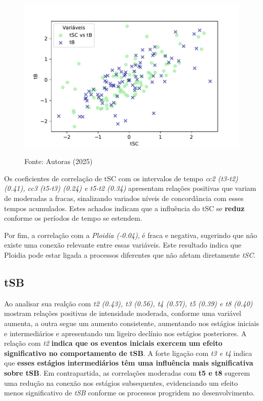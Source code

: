 \begin{figure}[h]
\begin{minipage}[b]{0.45\linewidth}
        \includegraphics[scale=0.35]{figuras/Spearman/tSC-tB.pdf}
        \vspace{0.3cm}
        \begin{minipage}{\linewidth}
            \centering
            \scriptsize{Fonte: Autoras (2025)}
        \end{minipage}
    \end{minipage}
\end{figure}
\FloatBarrier

Os coeficientes de correlação de tSC com os intervalos de tempo \textit{cc2 (t3-t2) (0.41), cc3 (t5-t3) (0.24) e t5-t2 (0.34)} apresentam relações positivas que variam de moderadas a fracas, sinalizando variados níveis de concordância com esses tempos acumulados. Estes achados indicam que a influência do tSC se \textbf{reduz} conforme os períodos de tempo se estendem.

Por fim, a correlação com a \textit{Ploidia (-0.04)}, é fraca e negativa, sugerindo que não existe uma conexão relevante entre essas variáveis. Este resultado indica que Ploidia pode estar ligada a processos diferentes que não afetam diretamente \textit{tSC}.

\subsection*{tSB}
Ao analisar sua realção com \textit{t2 (0.43), t3 (0.56), t4 (0.57), t5 (0.39) e t8 (0.40)} mostram relações positivas de intensidade moderada, conforme uma variável aumenta, a outra segue um aumento consistente, aumentando nos estágios iniciais e intermediários e apresentando um ligeiro declínio nos estágios posteriores. A relação com \textit{t2} \textbf{indica que os eventos iniciais exercem um efeito significativo no comportamento de \textbf{tSB}}. A forte ligação com \textit{t3 e t4} indica que \textbf{esses estágios intermediários têm uma influência mais significativa sobre \textbf{tSB}}. Em contrapartida, as correlações moderadas com \textbf{t5 e t8} sugerem uma redução na conexão nos estágios subsequentes, evidenciando um efeito menos significativo de \textit{tSB} conforme os processos progridem no desenvolvimento.

